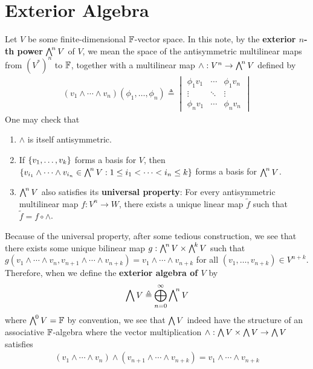 \documentclass{report}
\begin{document}
\section{Exterior Algebra}
Let $V$ be some finite-dimensional $\mathbb{F}$-vector space. In this note, by the \textbf{exterior $n$-th power} $\extp^n V$ of $V$, we mean the space of the antisymmetric multilinear maps from $(V^*)^n$ to $\mathbb{F}$, together with a multilinear map $\wedge :V^n \rightarrow \extp^n V$ defined by 
\begin{align*}
  (v_1\wedge  \cdots \wedge  v_n )(\phi_1, \dots ,\phi_n)\triangleq \begin{vmatrix} 
    \phi_1 v_1 & \cdots & \phi_1 v_n \\
    \vdots & \ddots & \vdots \\
    \phi_n v_1 & \cdots & \phi_n v_n 
  \end{vmatrix}
\end{align*}
One may check that 
\begin{enumerate}[label=(\alph*)]
  \item $\wedge$ is itself antisymmetric. 
  \item If $\left\{ v_1,\dots ,v_k \right\}$ forms a basis for $V$, then  $\set{v_{i_1}\wedge  \cdots \wedge   v_{i_n} \in \extp^n V : 1\leq i_1 < \cdots < i_n  \leq k}$ forms a basis for $\extp^n V$.
  \item $\extp^n V$ also satisfies its \textbf{universal property}: For every antisymmetric multilinear map $f:V^n \rightarrow W$, there exists a unique linear map $\tilde{f}$ such that $\tilde{f}= f \circ \wedge $.  
\end{enumerate}
Because of the universal property, after some tedious construction, we see that there exists some unique bilinear map $g:\extp^n V \times \extp^k V$ such that $g(v_1\wedge  \cdots \wedge  v_n, v_{n+1}\wedge  \cdots \wedge  v_{n+k})=v_1 \wedge  \cdots \wedge  v_{n+k}$ for all $(v_1,\dots ,v_{n+k})\in V^{n+k}$. Therefore, when we define the \textbf{exterior algebra of $V$} by
\begin{align*}
\extp V \triangleq \bigoplus_{n=0}^{\infty} \extp^n V
\end{align*}
where $\extp^0V= \F$ by convention, we see that $\extp V$ indeed have the structure of an associative $\mathbb{F}$-algebra where the vector multiplication $\wedge  :\extp V \times \extp V \rightarrow \extp V $ satisfies 
\begin{align}
\label{vm}
  (v_1 \wedge  \cdots \wedge  v_n  ) \wedge  (v_{n+1}\wedge  \cdots \wedge  v_{n+k})= v_1 \wedge  \cdots \wedge  v_{n+k}   
\end{align}
\end{document}
